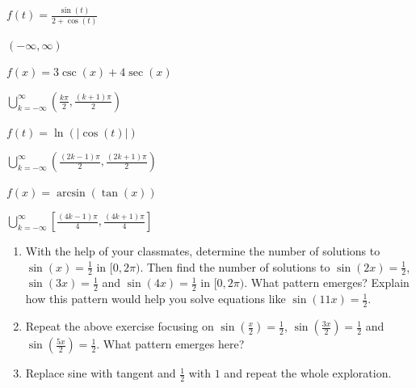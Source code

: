 \documentclass{ximera}
\begin{document}
\begin{question}
\begin{problem}
$f(t) = \frac{\sin(t)}{2 + \cos(t)}$

\begin{solution}
$(-\infty, \infty)$
\end{solution}
\end{problem}

\begin{problem}
$f(x) = 3\csc(x) + 4\sec(x)$ 

\begin{solution}
$\displaystyle \bigcup_{k=-\infty}^{\infty} \left( \frac{k\pi}{2}, \frac{(k+1)\pi}{2} \right)$
\end{solution}
\end{problem}

\begin{problem}
$f(t) = \ln\left( |\cos(t)| \right)$

\begin{solution}
$\displaystyle \bigcup_{k=-\infty}^{\infty} \left( \frac{(2k - 1)\pi}{2}, \frac{(2k+1)\pi}{2} \right)$
\end{solution}
\end{problem}

\begin{problem}\label{domainlast}
$f(x) = \arcsin(\tan(x))$ 

\begin{solution}
$\displaystyle \bigcup_{k=-\infty}^{\infty} \left[ \frac{(4k - 1)\pi}{4}, \frac{(4k+1)\pi}{4} \right]$
\end{solution}
\end{problem}

\end{question}

\begin{problem} \label{frequencynumberconnection} 

\begin{enumerate}

\item With the help of your classmates, determine the number of solutions to $\sin(x) = \frac{1}{2}$ in $[0,2\pi)$.  Then find the number of solutions to $\sin(2x) = \frac{1}{2}$,  $\sin(3x) = \frac{1}{2}$ and $\sin(4x) = \frac{1}{2}$ in $[0,2\pi)$. What pattern emerges?   Explain how this pattern would help you solve equations like $\sin(11x) = \frac{1}{2}$.  

\item Repeat the above exercise focusing on  $\sin\left(\frac{x}{2}\right)  = \frac{1}{2}$,  $\sin\left(\frac{3x}{2}\right)  = \frac{1}{2}$ and $\sin\left(\frac{5x}{2}\right)  = \frac{1}{2}$.  What pattern emerges here?  

\item  Replace sine with tangent and $\frac{1}{2}$ with $1$ and repeat the whole exploration.

\end{enumerate}

\end{problem}
\end{document}
